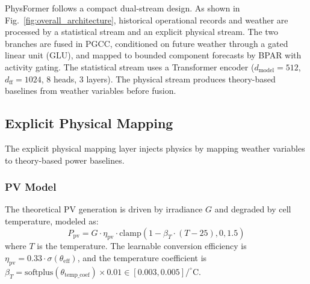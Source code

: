 PhysFormer follows a compact dual-stream design. As shown in Fig.~\ref{fig:overall_architecture}, historical operational records and weather are processed by a statistical stream and an explicit physical stream. The two branches are fused in PGCC, conditioned on future weather through a gated linear unit (GLU), and mapped to bounded component forecasts by BPAR with activity gating. The statistical stream uses a Transformer encoder ($d_{\text{model}}=512$, $d_{\text{ff}}=1024$, $8$ heads, $3$ layers). The physical stream produces theory-based baselines from weather variables before fusion.

\subsection{Explicit Physical Mapping}
The explicit physical mapping layer injects physics by mapping weather variables to theory-based power baselines.

\subsubsection{PV Model}
The theoretical PV generation is driven by irradiance $G$ and degraded by cell temperature, modeled as:
\begin{equation}
    P_{\text{pv}} = G \cdot \eta_{\text{pv}} \cdot \text{clamp}(1 - \beta_T \cdot (T - 25), 0, 1.5)
\label{eq:pv_model}
\end{equation}
where $T$ is the temperature. The learnable conversion efficiency is $\eta_{\text{pv}} = 0.33 \cdot \sigma(\theta_{\text{eff}})$, and the temperature coefficient is $\beta_T = \text{softplus}(\theta_{\text{temp\_coef}}) \times 0.01 \in [0.003, 0.005]/^\circ\text{C}$.

